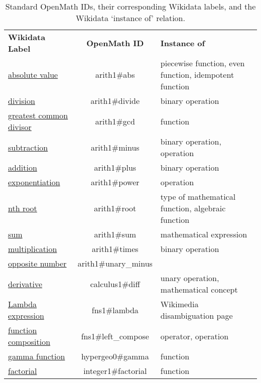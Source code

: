 \documentclass[a4paper]{article}
\begin{document}
\begin{table}[p]
\caption{Standard OpenMath IDs, their corresponding Wikidata labels, and the Wikidata `instance of' relation.}
\vspace{2em}
\label{tb1}
\begin{tabular}{p{.23\linewidth}cp{.5\linewidth}}
\textbf{Wikidata Label} & \textbf{OpenMath ID} & \textbf{Instance of} \\
\href{https://www.wikidata.org/entity/Q120812}{absolute value} & arith1\#abs & piecewise function, even function, idempotent function \\
\href{https://www.wikidata.org/entity/Q1226939}{division} & arith1\#divide & binary operation \\
\href{https://www.wikidata.org/entity/Q131752}{greatest common divisor} & arith1\#gcd & function \\
\href{https://www.wikidata.org/entity/Q40754}{subtraction} & arith1\#minus & binary operation, operation \\
\href{https://www.wikidata.org/entity/Q32043}{addition} & arith1\#plus & binary operation \\
\href{https://www.wikidata.org/entity/Q33456}{exponentiation} & arith1\#power & operation \\
\href{https://www.wikidata.org/entity/Q601053}{nth root} & arith1\#root & type of mathematical function, algebraic function \\
\href{https://www.wikidata.org/entity/Q218005}{sum} & arith1\#sum & mathematical expression \\
\href{https://www.wikidata.org/entity/Q40276}{multiplication} & arith1\#times & binary operation \\
\href{https://www.wikidata.org/entity/Q715358}{opposite number} & arith1\#unary\_minus &  \\
\href{https://www.wikidata.org/entity/Q29175}{derivative} & calculus1\#diff & unary operation, mathematical concept \\
\href{https://www.wikidata.org/entity/Q6481163}{Lambda expression} & fns1\#lambda & Wikimedia disambiguation page \\
\href{https://www.wikidata.org/entity/Q244761}{function composition} & fns1\#left\_compose & operator, operation \\
\href{https://www.wikidata.org/entity/Q190573}{gamma function} & hypergeo0\#gamma & function \\
\href{https://www.wikidata.org/entity/Q120976}{factorial} & integer1\#factorial & function \\

\end{tabular}
\end{table}
\end{document}
